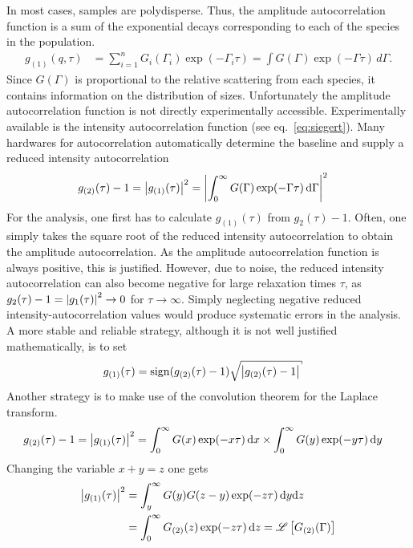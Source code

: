 In most cases, samples are polydisperse. Thus, the amplitude autocorrelation function is a sum of the exponential decays corresponding to each of the species in the population.
\begin{align}
    g_{(1)}(q,\tau) &= \sum_{i=1}^n G_i(\Gamma_i)\exp(-\Gamma_i\tau) = \int G(\Gamma)\exp(-\Gamma\tau)\,d\Gamma.
\end{align}
 Since $G(\Gamma)$ is proportional to the relative scattering from each species, it contains information on the distribution of sizes. Unfortunately the amplitude autocorrelation function is not directly experimentally accessible. Experimentally available is the intensity autocorrelation function (see eq.\ \ref{eq:siegert}). Many hardwares for autocorrelation automatically determine the baseline and supply a reduced intensity autocorrelation
 \begin{align}
 g_{(2)}(\tau)-1 &={\left\vert g_{(1)}(\tau)\right\vert}^2 = {\left\vert\int_0^\infty G(\Gamma) \exp(-\Gamma\tau)\,\mathrm{d}\Gamma\right\vert}^2
 \end{align}
For the analysis, one first has to calculate $g_{(1)}(\tau)$ from $g_2(\tau)-1$. Often, one simply takes the square root of the reduced intensity autocorrelation to obtain the amplitude autocorrelation. As the amplitude autocorrelation function is always positive, this is justified. However, due to noise, the reduced intensity autocorrelation can also become negative for large relaxation times $\tau$, as $g_2(\tau)-1={\left\vert g_1(\tau)\right\vert}^2 \rightarrow 0$ for $\tau\rightarrow\infty$. Simply neglecting negative reduced intensity-autocorrelation values would produce systematic errors in the analysis. A more stable and reliable strategy, although it is not well justified mathematically, is to set
\begin{align}
\label{eq:sqrt_g2m1}
 g_{(1)}(\tau) &= \mathrm{sign}(g_{(2)}(\tau)-1) \sqrt{\abs{g_{(2)}(\tau)-1}}
\end{align}
Another strategy is to make use of the convolution theorem for the Laplace transform.
\begin{align}\label{eq:Lg2}
 g_{(2)}(\tau)-1 &={\left\vert g_{(1)}(\tau)\right\vert}^2 = \int_0^\infty G(x) \exp(-x\tau)\,\mathrm{d}x \times \int_0^\infty G(y) \exp(-y\tau)\,\mathrm{d}y
 \end{align}
 Changing the variable $x+y=z$ one gets
\begin{align}
 {\left\vert g_{(1)}(\tau)\right\vert}^2 &= \int_y^\infty G(y) G(z-y)\exp(-z\tau)\,\mathrm{d}y\mathrm{d}z \\
                   &= \int_0^\infty G_{(2)}(z) \exp(-z\tau)\,\mathrm{d}z = \mathcal{L}\left[G_{(2)}(\Gamma)\right]
 \end{align}

